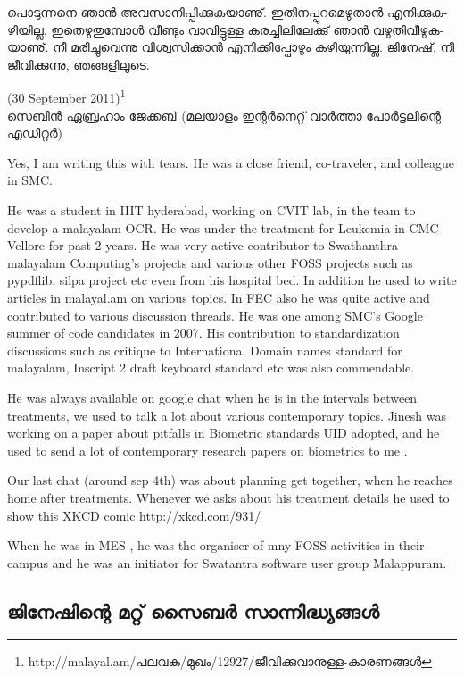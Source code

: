 ­പൊ­ടു­ന്ന­നെ ഞാന്‍ അവ­സാ­നി­പ്പി­ക്കു­ക­യാ­ണു്. ഇതി­ന­പ്പു­റ­മെ­ഴു­താന്‍ എനി­ക്കു­ക­ഴി­യി­ല്ല. ഇതെ­ഴു­തു­മ്പോള്‍ വീ­ണ്ടും വാ­വി­ട്ടു­ള്ള 
കര­ച്ചി­ലി­ലേ­ക്കു് ഞാന്‍ വഴു­തി­വീ­ഴു­ക­യാ­ണു്. നീ മരി­ച്ചു­വെ­ന്നു വി­ശ്വ­സി­ക്കാന്‍ എനി­ക്കി­പ്പോ­ഴും കഴി­യു­ന്നി­ല്ല. ജി­നേ­ഷ്, നീ ജീ­വി­ക്കു­ന്നു, 
ഞങ്ങ­ളി­ലൂ­ടെ­.

(30  September 2011)\footnote{http://malayal.am/പലവക/മുഖം/12927/ജീവിക്കുവാനുള്ള-കാരണങ്ങള്‍}\\
സെ­ബിന്‍ ഏബ്ര­ഹാം ജേ­ക്ക­ബ് (മലയാളം ഇന്റര്‍നെറ്റ് വാര്‍ത്താ പോര്‍ട്ടലിന്റെ എഡിറ്റര്‍)

\newpage

{\vskip 2pt}

Yes, I am writing this with tears. He was a close friend,
co-traveler, and colleague in SMC.

He was a student in IIIT hyderabad, working on CVIT lab, in the team
to develop a malayalam OCR. He was under the treatment for Leukemia in
CMC Vellore for past 2 years. He was very active contributor to
Swathanthra malayalam Computing's projects and various other FOSS
projects such as pypdflib, silpa project etc even from his hospital
bed. In addition he used to write articles in malayal.am on various
topics. In FEC also he was quite active and contributed to various
discussion threads. He was one among SMC's  Google summer of code
candidates in 2007. His contribution to standardization discussions
such as critique to International Domain names standard for malayalam,
Inscript 2 draft keyboard standard etc was also commendable.

He was always available on google chat when he is in the intervals
between treatments, we used to talk a lot about various contemporary
topics. Jinesh was working on a paper about pitfalls in Biometric
standards UID adopted, and he used to send a lot of contemporary
research papers on biometrics to me .

Our last chat (around sep 4th) was about planning get together, when
he reaches home after treatments.
Whenever we asks about his treatment details he used to show this XKCD comic
http://xkcd.com/931/

When he was in MES , he was the organiser of mny FOSS activities in
their campus and he was an initiator for Swatantra software user group
Malappuram.

\subsection*{­ജി­നേ­ഷി­ന്റെ മറ്റ് സൈ­ബര്‍ സാ­ന്നി­ദ്ധ്യ­ങ്ങള്‍}

